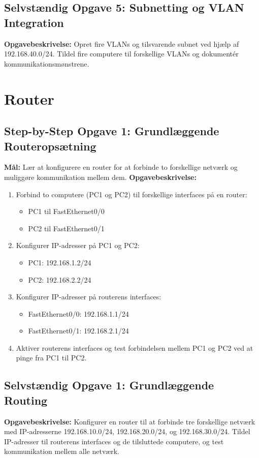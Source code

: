 \subsection*{Selvstændig Opgave 5: Subnetting og VLAN Integration}
\textbf{Opgavebeskrivelse:} Opret fire VLANs og tilsvarende subnet ved hjælp af 192.168.40.0/24. Tildel fire computere til forskellige VLANs og dokumentér kommunikationsmønstrene.

\section{Router}
\subsection*{Step-by-Step Opgave 1: Grundlæggende Routeropsætning}
\textbf{Mål:} Lær at konfigurere en router for at forbinde to forskellige netværk og muliggøre kommunikation mellem dem.
\newline\newline\noindent
\textbf{Opgavebeskrivelse:}
\begin{enumerate}
	\item Forbind to computere (PC1 og PC2) til forskellige interfaces på en router:
	\begin{itemize}
		\item PC1 til FastEthernet0/0
		\item PC2 til FastEthernet0/1
	\end{itemize}
	\item Konfigurer IP-adresser på PC1 og PC2:
	\begin{itemize}
		\item PC1: 192.168.1.2/24
		\item PC2: 192.168.2.2/24
	\end{itemize}
	\item Konfigurer IP-adresser på routerens interfaces:
	\begin{itemize}
		\item FastEthernet0/0: 192.168.1.1/24
		\item FastEthernet0/1: 192.168.2.1/24
	\end{itemize}
	\item Aktiver routerens interfaces og test forbindelsen mellem PC1 og PC2 ved at pinge fra PC1 til PC2.
\end{enumerate}

\subsection*{Selvstændig Opgave 1: Grundlæggende Routing}
\textbf{Opgavebeskrivelse:} Konfigurer en router til at forbinde tre forskellige netværk med IP-adresserne 192.168.10.0/24, 192.168.20.0/24, og 192.168.30.0/24. Tildel IP-adresser til routerens interfaces og de tilsluttede computere, og test kommunikation mellem alle netværk.

